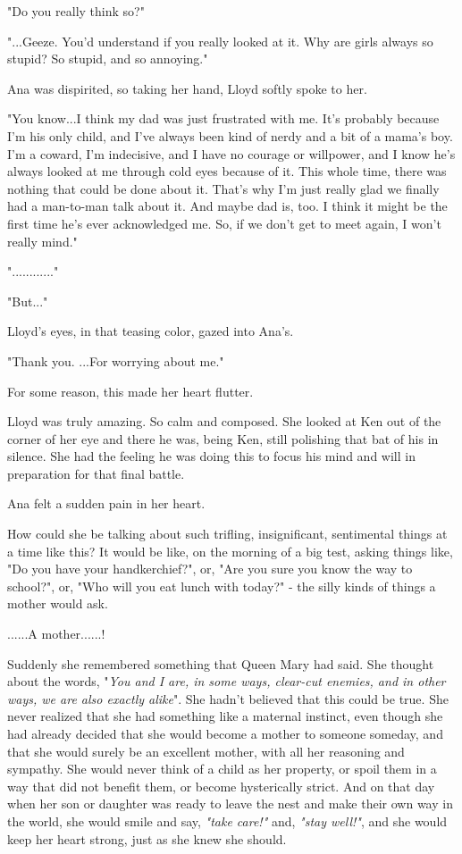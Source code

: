 \documentclass[
]{article}
\begin{document}
"Do you really think so?"

"...Geeze. You'd understand if you really looked at it. Why are girls
always so stupid? So stupid, and so annoying."

Ana was dispirited, so taking her hand, Lloyd softly spoke to her.

"You know...I think my dad was just frustrated with me. It's probably
because I'm his only child, and I've always been kind of nerdy and a bit
of a mama's boy. I'm a coward, I'm indecisive, and I have no courage or
willpower, and I know he's always looked at me through cold eyes because
of it. This whole time, there was nothing that could be done about it.
That's why I'm just really glad we finally had a man-to-man talk about
it. And maybe dad is, too. I think it might be the first time he's ever
acknowledged me. So, if we don't get to meet again, I won't really
mind."

"............"

"But..."

Lloyd's eyes, in that teasing color, gazed into Ana's.

"Thank you. ...For worrying about me."

For some reason, this made her heart flutter.

Lloyd was truly amazing. So calm and composed. She looked at Ken out of
the corner of her eye and there he was, being Ken, still polishing that
bat of his in silence. She had the feeling he was doing this to focus
his mind and will in preparation for that final battle.

Ana felt a sudden pain in her heart.

How could she be talking about such trifling, insignificant, sentimental
things at a time like this? It would be like, on the morning of a big
test, asking things like, "Do you have your handkerchief?", or, "Are you
sure you know the way to school?", or, "Who will you eat lunch with
today?" - the silly kinds of things a mother would ask.

......A mother......!

Suddenly she remembered something that Queen Mary had said. She thought
about the words, "\emph{You and I are, in some ways, clear-cut enemies,
and in other ways, we are also exactly alike}". She hadn't believed that
this could be true. She never realized that she had something like a
maternal instinct, even though she had already decided that she would
become a mother to someone someday, and that she would surely be an
excellent mother, with all her reasoning and sympathy. She would never
think of a child as her property, or spoil them in a way that did not
benefit them, or become hysterically strict. And on that day when her
son or daughter was ready to leave the nest and make their own way in
the world, she would smile and say, \emph{"take care!"} and, \emph{"stay
well!"}, and she would keep her heart strong, just as she knew she
should.
\end{document}
